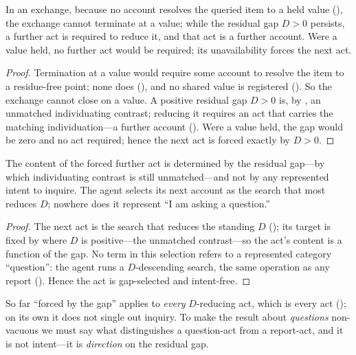\documentclass[11pt,twocolumn,a4paper]{article}
\newcommand{\dem}{D}
\begin{document}
\begin{theorem}
\label{thm:forcedact}
In an exchange, because no account resolves the queried item to a held value
(), the
exchange cannot terminate at a
value; while the residual gap $\dem>0$ persists, a further act is required to
reduce it, and that act is a further account. Were a value held, no further
act would be required; its unavailability forces the next act.
\end{theorem}

\begin{proof}
Termination at a value would require some account to resolve the item to a
residue-free point; none does (),
and no shared value
is registered (). So the exchange cannot close on a
value. A positive residual gap $\dem>0$ is, by , an
unmatched individuating contrast; reducing it requires an act that carries
the matching individuation---a further account (). Were
a value held, the gap would be zero and no act required; hence the next act
is forced exactly by $\dem>0$.
\end{proof}

\begin{theorem}
\label{thm:gapselects}
The content of the forced further act is determined by the residual gap---by
which individuating contrast is still unmatched---and not by any represented
intent to inquire. The agent selects its next account as the search that
most reduces $\dem$; nowhere does it represent ``I am asking a question.''
\end{theorem}

\begin{proof}
The next act is the search that reduces the standing $\dem$
(); its target is fixed by where $\dem$ is
positive---the unmatched contrast---so the act's content is a function of the
gap. No term in this selection refers to a represented category ``question'':
the agent runs a $\dem$-descending search, the same operation as any report
(). Hence the act is gap-selected and intent-free.
\end{proof}

So far ``forced by the gap'' applies to \emph{every} $\dem$-reducing act,
which is every act (); on its own it does
not single out inquiry. To make the result about \emph{questions}
non-vacuous we must say what distinguishes a question-act from a report-act,
and it is not intent---it is \emph{direction} on the residual gap.
\end{document}
